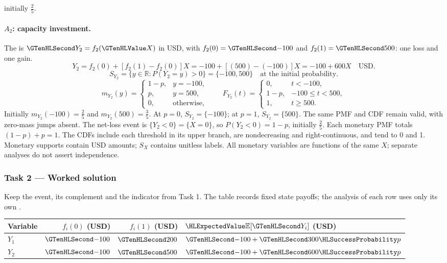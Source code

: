 initially $\frac{2}{5}$.
\paragraph{$A_2$: capacity investment.}
The  is $\Money{Y_2}=f_2(\Indicator{X})$ in USD,
with $f_2(0)=\Money{-100}$ and $f_2(1)=\Money{500}$: one loss and one gain.
\[
Y_2=f_2(0)+[f_2(1)-f_2(0)]X=-100+[(500)-(-100)]X=-100+600X\quad\text{USD}.
\]
\[S_{Y_2}=\{y\in\mathbb R:P(Y_2=y)>0\}=\{-100,500\}\quad\text{at the initial probability}.\]
\[
m_{Y_2}(y)=\begin{cases}1-p,&y=-100,\\p,&y=500,\\0,&\text{otherwise},\end{cases}
\qquad F_{Y_2}(t)=\begin{cases}0,&t<-100,\\1-p,&-100\leq t<500,\\1,&t\geq 500.\end{cases}
\]
Initially $m_{Y_2}(-100)=\frac{2}{5}$ and $m_{Y_2}(500)=\frac{3}{5}$.
At $p=0$, $S_{Y_2}=\{-100\}$; at $p=1$, $S_{Y_2}=\{500\}$.
The same PMF and CDF remain valid, with zero-mass jumps absent.
The net-loss event is $\{Y_2<0\}=\{X=0\}$, so $P(Y_2<0)=1-p$,
initially $\frac{2}{5}$.
Each monetary PMF totals $(1-p)+p=1$. The CDFs include each threshold
in its upper branch, are nondecreasing and right-continuous, and tend to 0 and 1.
Monetary supports contain USD amounts; $S_X$ contains unitless labels.
All monetary variables are functions of the same $X$; separate analyses do not assert independence.
\clearpage\subsubsection*{Task 2 --- Worked solution}\label{sol:c3-manufacturing-decision}
Keep the event, its complement and the indicator from Task 1.
The table records fixed state payoffs; the analysis of each row uses only its own .
\begin{center}\begin{tabular}{lrrl}\toprule
Variable & $f_i(0)$ (USD) & $f_i(1)$ (USD) & $\ExpectedValue{\mathbb E}[\Money{Y_i}]$ (USD)\\\midrule
$Y_1$ & $\Money{-100}$ & $\Money{200}$ & $\Money{-100}+\Money{300}\SuccessProb{p}$\\
$Y_2$ & $\Money{-100}$ & $\Money{500}$ & $\Money{-100}+\Money{600}\SuccessProb{p}$\\
\bottomrule\end{tabular}\end{center}
